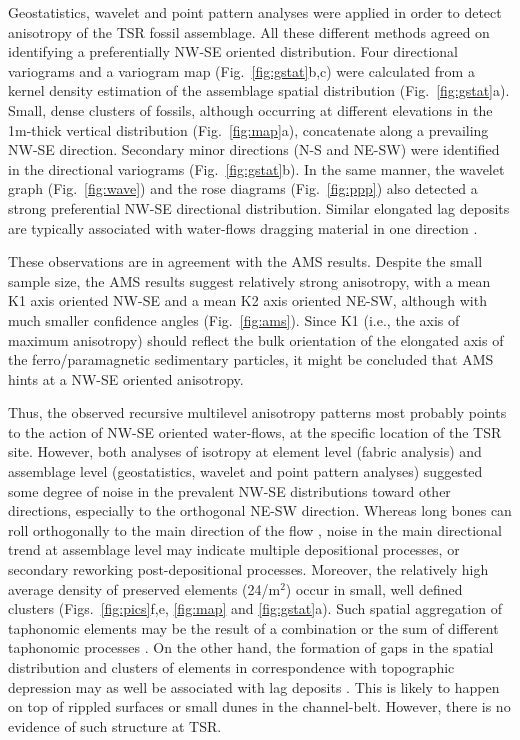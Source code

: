 \documentclass[review,times,authoryear]{elsarticle} %
\begin{document}
Geostatistics, wavelet and point pattern analyses were applied in order to detect anisotropy of the TSR fossil assemblage. All these different methods agreed on identifying a preferentially NW-SE oriented distribution. Four directional variograms and a variogram map (Fig.~\ref{fig:gstat}b,c) were calculated from a kernel density estimation of the assemblage spatial distribution (Fig.~\ref{fig:gstat}a). Small, dense clusters of fossils, although occurring at different elevations in the 1m-thick vertical distribution (Fig.~\ref{fig:map}a), concatenate along a prevailing NW-SE direction. Secondary minor directions (N-S and NE-SW) were identified in the directional variograms (Fig.~\ref{fig:gstat}b). In the same manner, the wavelet graph (Fig.~\ref{fig:wave}) and the rose diagrams (Fig.~\ref{fig:ppp}) also detected a strong preferential NW-SE directional distribution. Similar elongated lag deposits are typically associated with water-flows dragging material in one direction \citep{Dominguez-Rodrigo2012}.

These observations are in agreement with the AMS results. Despite the small sample size, the AMS results suggest relatively strong anisotropy, with a mean K1 axis oriented NW-SE and a mean K2 axis oriented NE-SW, although with much smaller confidence angles (Fig.~\ref{fig:ams}). Since K1 (i.e., the axis of maximum anisotropy) should reflect the bulk orientation of the elongated axis of the ferro/paramagnetic sedimentary particles, it might be concluded that AMS hints at a NW-SE oriented anisotropy.

Thus, the observed recursive multilevel anisotropy patterns most probably points to the action of NW-SE oriented water-flows, at the specific location of the TSR site. However, both analyses of isotropy at element level (fabric analysis) and assemblage level (geostatistics, wavelet and point pattern analyses) suggested some degree of noise in the prevalent NW-SE distributions toward other directions, especially to the orthogonal NE-SW direction. Whereas long bones can roll orthogonally to the main direction of the flow \citep{Voorhies1969}, noise in the main directional trend at assemblage level may indicate multiple depositional processes, or secondary reworking post-depositional processes. Moreover, the relatively high average density of preserved elements (24/m$^2$) occur in small, well defined clusters (Figs.~\ref{fig:pics}f,e, \ref{fig:map} and \ref{fig:gstat}a). Such spatial aggregation of taphonomic elements may be the result of a combination or the sum of different taphonomic processes \citep{Fernandez-Lopez2002}. On the other hand, the formation of gaps in the spatial distribution and clusters of elements in correspondence with topographic depression may as well be associated with lag deposits \citep{Petraglia1994}. This is likely to happen on top of rippled surfaces or small dunes in the channel-belt. However, there is no evidence of such structure at TSR.
\end{document}
